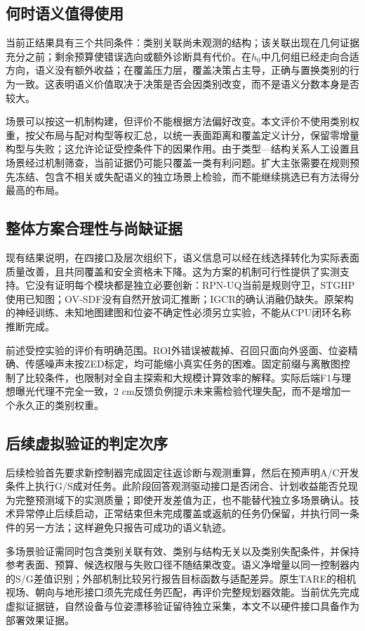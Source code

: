 \documentclass[11pt,a4paper]{article}
\begin{document}
\subsection{何时语义值得使用}
当前正结果具有三个共同条件：类别关联尚未观测的结构；该关联出现在几何证据充分之前；剩余预算使错误选向或额外诊断具有代价。在$h_0$中几何组已经走向合适方向，语义没有额外收益；在覆盖压力层，覆盖决策占主导，正确与置换类别的行为一致。这表明语义价值取决于决策是否会因类别改变，而不是语义分数本身是否较大。

场景可以按这一机制构建，但评价不能根据方法偏好改变。本文评价不使用类别权重，按父布局与配对构型等权汇总，以统一表面距离和覆盖定义计分，保留零增量构型与失败；这允许论证受控条件下的因果作用。由于类型—结构关系人工设置且场景经过机制筛查，当前证据仍可能只覆盖一类有利问题。扩大主张需要在规则预先冻结、包含不相关或失配语义的独立场景上检验，而不能继续挑选已有方法得分最高的布局。

\subsection{整体方案合理性与尚缺证据}
现有结果说明，在四接口及层次组织下，语义信息可以经在线选择转化为实际表面质量改善，且共同覆盖和安全资格未下降。这为方案的机制可行性提供了实测支持。它没有证明每个模块都是独立必要创新：RPN-UQ当前是规则守卫，STGHP使用已知图；OV-SDF没有自然开放词汇推断；IGCR的确认消融仍缺失。原架构的神经训练、未知地图建图和位姿不确定性必须另立实验，不能从CPU闭环名称推断完成。

前述受控实验的评价有明确范围。ROI外错误被裁掉、召回只面向外竖面、位姿精确、传感噪声未按ZED标定，均可能缩小真实任务的困难。固定前缀与离散图控制了比较条件，也限制对全自主探索和大规模计算效率的解释。实际后端F1与理想曝光代理不完全一致，2 cm反馈负例提示未来需检验代理失配，而不是增加一个永久正的类别权重。

\subsection{后续虚拟验证的判定次序}
后续检验首先要求新控制器完成固定往返诊断与观测重算，然后在预声明A/C开发条件上执行G/S成对任务。此阶段回答观测驱动接口是否闭合、计划收益能否兑现为完整预测域下的实测质量；即使开发差值为正，也不能替代独立多场景确认。技术异常停止后续启动，正常结束但未完成覆盖或返航的任务仍保留，并执行同一条件的另一方法；这样避免只报告可成功的语义轨迹。

多场景验证需同时包含类别关联有效、类别与结构无关以及类别失配条件，并保持参考表面、预算、候选权限与失败口径不随结果改变。语义净增量以同一控制器内的S/G差值识别；外部机制比较另行报告目标函数与适配差异。原生TARE的相机视场、朝向与地形接口须先完成任务匹配，再评价完整规划器效能。当前优先完成虚拟证据链，自然设备与位姿漂移验证留待独立采集，本文不以硬件接口具备作为部署效果证据。
\end{document}
